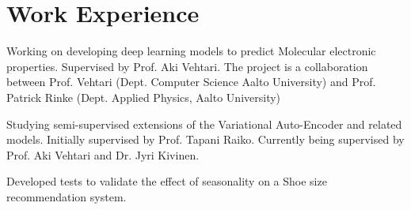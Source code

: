 \documentclass[]{deedy-resume}
\begin{document}
\begin{minipage}[t]{0.66\textwidth} 


\section{Work Experience}
\vspace{\topsep} %
\begin{tightemize}
\item Working on developing deep learning models to predict Molecular electronic properties. Supervised by Prof. Aki Vehtari. The project is a collaboration between Prof. Vehtari (Dept. Computer Science Aalto University) and Prof. Patrick Rinke (Dept. Applied Physics, Aalto University) 
\end{tightemize}
\sectionsep


\begin{tightemize}
\item Studying semi-supervised extensions of the Variational Auto-Encoder and related models. Initially supervised by Prof. Tapani Raiko. Currently being supervised by Prof. Aki Vehtari and Dr. Jyri Kivinen. 
\end{tightemize}
\sectionsep

\begin{tightemize}
\item Developed tests to validate the effect of seasonality on a Shoe size recommendation system.
\end{tightemize}
\sectionsep

\sectionsep


\end{minipage}
\end{document}
